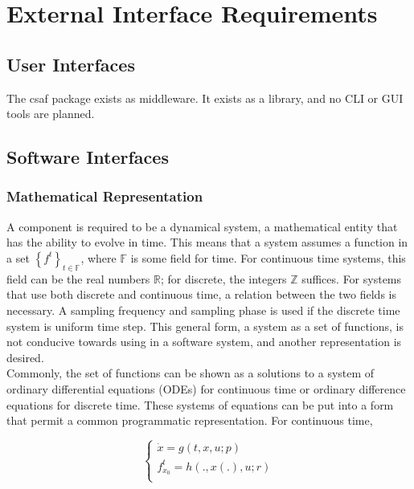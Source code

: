 \chapter{External Interface Requirements}

\section{User Interfaces}

The \acrshort{csaf}  package exists as middleware. It exists as a library, and no CLI or GUI tools are planned.

\section{Software Interfaces}

\subsection{Mathematical Representation}
A component is required to be a dynamical system, a mathematical entity that has the ability to evolve in time. 
This means that a system assumes a function in a set $\left\{ f^t \right\}_{t \in \mathbb F}$, where $\mathbb F
$ is some field for time. For continuous time systems, this field can be the real numbers $\mathbb R$; for 
discrete, the integers $\mathbb Z$ suffices. For systems that use both discrete and continuous time, a 
relation between the two fields is necessary. A sampling frequency and sampling phase is used if the discrete 
time system is uniform time step. This general form, a system as a set of functions, is not conducive towards 
using in a software system, and another representation is desired. \\

Commonly, the set of functions can be shown as a solutions to a system of ordinary differential equations 
(ODEs) for continuous time or ordinary difference equations for discrete time. These systems of equations 
can be put into a form that permit a common programmatic representation. For continuous time,

\begin{equation}
\begin{cases}
\dot x = g(t, x, u; p) \\
f_{x_0}^t = h(., x(.), u; r) \\
\end{cases}
\end{equation}

